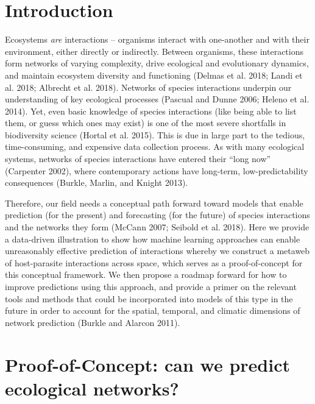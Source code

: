 \documentclass[11pt]{article}
\begin{document}
\clearpage
\linenumbers
\pagestyle{normal}

\hypertarget{introduction}{%
\section{Introduction}\label{introduction}}

Ecosystems \emph{are} interactions -- organisms interact with
one-another and with their environment, either directly or indirectly.
Between organisms, these interactions form networks of varying
complexity, drive ecological and evolutionary dynamics, and maintain
ecosystem diversity and functioning (Delmas et al. 2018; Landi et al.
2018; Albrecht et al. 2018). Networks of species interactions underpin
our understanding of key ecological processes (Pascual and Dunne 2006;
Heleno et al. 2014). Yet, even basic knowledge of species interactions
(like being able to list them, or guess which ones may exist) is one of
the most severe shortfalls in biodiversity science (Hortal et al. 2015).
This is due in large part to the tedious, time-consuming, and expensive
data collection process. As with many ecological systems, networks of
species interactions have entered their ``long now'' (Carpenter 2002),
where contemporary actions have long-term, low-predictability
consequences (Burkle, Marlin, and Knight 2013).

Therefore, our field needs a conceptual path forward toward models that
enable prediction (for the present) and forecasting (for the future) of
species interactions and the networks they form (McCann 2007; Seibold et
al. 2018). Here we provide a data-driven illustration to show how
machine learning approaches can enable unreasonably effective prediction
of interactions whereby we construct a metaweb of host-parasite
interactions across space, which serves as a proof-of-concept for this
conceptual framework. We then propose a roadmap forward for how to
improve predictions using this approach, and provide a primer on the
relevant tools and methods that could be incorporated into models of
this type in the future in order to account for the spatial, temporal,
and climatic dimensions of network prediction (Burkle and Alarcon 2011).

\hypertarget{proof-of-concept-can-we-predict-ecological-networks}{%
\section{Proof-of-Concept: can we predict ecological
networks?}\label{proof-of-concept-can-we-predict-ecological-networks}}
\end{document}
